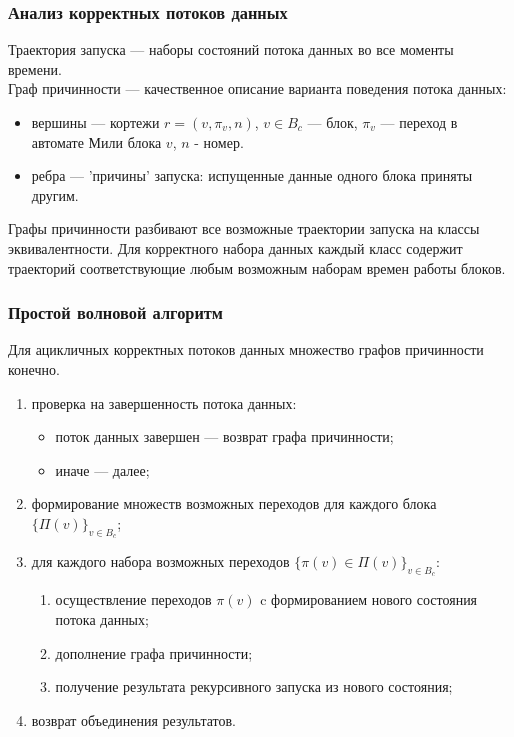 \documentclass[10pt,pdf,hyperref={unicode}]{beamer}
\begin{document}
\begin{frame}
  \frametitle{Анализ корректных потоков данных}
  Траектория запуска --- наборы состояний потока данных во все моменты времени. \\
  Граф причинности --- качественное описание варианта поведения потока данных:
  \begin{itemize}
    \item вершины --- кортежи $r = (v, \pi_v, n)$, $v \in B_c$ --- блок, $\pi_v$ --- переход в автомате Мили блока $v$, $n$ - номер.
    \item ребра --- 'причины' запуска: испущенные данные одного блока приняты другим.
  \end{itemize}
  Графы причинности разбивают все возможные траектории запуска на классы эквивалентности.
  Для корректного набора данных каждый класс содержит траекторий соответствующие любым возможным наборам времен работы блоков.
\end{frame}

\begin{frame}
  \frametitle{Простой волновой алгоритм}
  Для ацикличных корректных потоков данных множество графов причинности конечно.
  \begin{enumerate}
    \item проверка на завершенность потока данных:
      \begin{itemize}
        \item поток данных завершен --- возврат графа причинности;
        \item иначе --- далее;
      \end{itemize}
    \item формирование множеств возможных переходов для каждого блока $\{\Pi(v)\}_{v \in B_c}$;
    \item для каждого набора возможных переходов $\{\pi(v) \in \Pi(v)\}_{v \in B_c}$:
    \begin{enumerate}
      \item осуществление переходов $\pi(v)$ c формированием нового состояния потока данных;
      \item дополнение графа причинности;
      \item получение результата рекурсивного запуска из нового состояния;
    \end{enumerate}
    \item возврат объединения результатов.
  \end{enumerate}
\end{frame}
\end{document}
